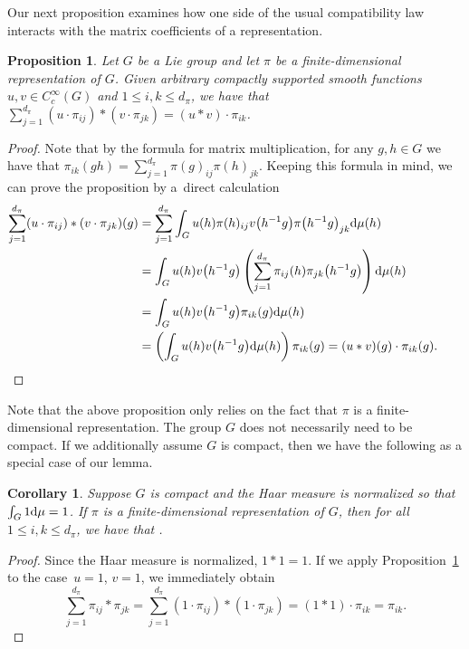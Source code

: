\documentclass[10pt,a4paper]{amsart}
\numberwithin{equation}{section}
\newtheorem{Corollary}[Theorem]{Corollary}
\newtheorem{Proposition}[Theorem]{Proposition}
\theoremstyle{definition}
\newcommand{\inv}{^{-1}}
\begin{document}
Our next proposition examines how one side of the usual compatibility law interacts with the matrix coefficients of a representation.
 \begin{Proposition}\label{proposition:convolution.of.non.irreducible.coefficients}
  Let $ G $ be a Lie group and let $ \pi $ be a finite-dimensional representation of $ G $. Given arbitrary compactly supported smooth functions $ u, v \in C_c^\infty(G) $ and
  $1 \le i, k \le d_\pi $,
  we have that
$\sum_{j=1}^{d_\pi} (u \cdot \pi_{ij}) * ( v \cdot \pi_{jk}) = (u * v) \cdot \pi_{ik}$.
\end{Proposition}
\begin{proof}
Note that by the formula for matrix multiplication, for any $ g,h \in G $ we have that
$\pi_{ik}(gh) = \sum_{j=1}^{d_\pi} \pi(g)_{ij} \pi(h)_{jk}$.
Keeping this formula in mind, we can prove the proposition by a~direct calculation
\begin{align*}
   \sum_{j=1}^{d_\pi} ( u \cdot \pi_{ij} ) * ( v \cdot \pi_{jk} ) (g) &= \sum_{j=1}^{d_\pi} \int_{G} u(h) \pi(h)_{ij} v\big(h\inv g\big) \pi\big(h\inv g\big)_{jk} {\rm d} \mu(h) \\
  &= \int_{G} u(h) v\big(h\inv g\big) \left( \sum_{j=1}^{d_\pi} \pi_{ij}(h) \pi_{jk}\big(h\inv g\big) \right) {\rm d} \mu(h) \\
   &= \int_G u(h) v\big(h\inv g\big) \pi_{ik}(g) {\rm d} \mu(h)  \\
   &= \left( \int_G u(h) v\big(h\inv g\big) {\rm d} \mu(h)\right) \pi_{ik}(g) = ( u * v)(g) \cdot \pi_{ik}(g).\tag*{\qed}
\end{align*}\renewcommand{\qed}{}
\end{proof}

Note that the above proposition only relies on the fact that $ \pi $ is a finite-dimensional representation. The group $ G $ does not necessarily need to be compact. If we additionally assume $ G $ is compact, then we have the following as a special case of our lemma.
\begin{Corollary}\label{corollary:conv.of.non.irred}
  Suppose $ G $ is compact and the Haar measure is normalized so that ${\int_G 1 {\rm d} \mu = 1}$. If $ \pi $ is a finite-dimensional representation of $ G $, then for all
  $1 \le i, k \le d_\pi$,
  we have that .
\end{Corollary}
\begin{proof}
   Since the Haar measure is normalized, $ 1 * 1 = 1 $. If we apply Proposition~\ref{proposition:convolution.of.non.irreducible.coefficients} to the case~${ u = 1}$, $v = 1 $, we immediately obtain
  \[ \sum_{j=1}^{d_\pi} \pi_{ij} * \pi_{jk} = \sum_{j=1}^{d_\pi} (1 \cdot \pi_{ij}) * (1 \cdot \pi_{jk}) = (1 * 1) \cdot \pi_{ik} = \pi_{ik}.\tag*{\qed}
   \]\renewcommand{\qed}{}
\end{proof}
\end{document}
